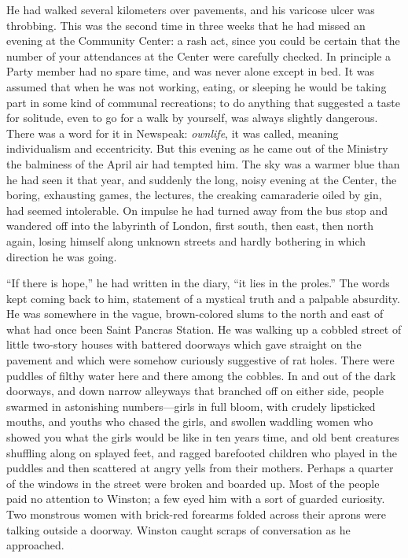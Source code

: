 He had walked several kilometers over pavements, and his varicose ulcer
was throbbing. This was the second time in three weeks that he had
missed an evening at the Community Center: a rash act, since you could
be certain that the number of your attendances at the Center were
carefully checked. In principle a Party member had no spare time, and
was never alone except in bed. It was assumed that when he was not
working, eating, or sleeping he would be taking part in some kind of
communal recreations; to do anything that suggested a taste for
solitude, even to go for a walk by yourself, was always slightly
dangerous. There was a word for it in Newspeak: \emph{ownlife}, it was
called, meaning individualism and eccentricity. But this evening as he
came out of the Ministry the balminess of the April air had tempted him.
The sky was a warmer blue than he had seen it that year, and suddenly
the long, noisy evening at the Center, the boring, exhausting games, the
lectures, the creaking camaraderie oiled by gin, had seemed intolerable.
On impulse he had turned away from the bus stop and wandered off into
the labyrinth of London, first south, then east, then north again,
losing himself along unknown streets and hardly bothering in which
direction he was going.

``If there is hope,'' he had written in the diary, ``it lies in the
proles.'' The words kept coming back to him, statement of a mystical
truth and a palpable absurdity. He was somewhere in the vague,
brown-colored slums to the north and east of what had once been Saint
Pancras Station. He was walking up a cobbled street of little two-story
houses with battered doorways which gave straight on the pavement and
which were somehow curiously suggestive of rat holes. There were puddles
of filthy water here and there among the cobbles. In and out of the dark
doorways, and down narrow alleyways that branched off on either side,
people swarmed in astonishing numbers---girls in full bloom, with
crudely lipsticked mouths, and youths who chased the girls, and swollen
waddling women who showed you what the girls would be like in ten years
time, and old bent creatures shuffling along on splayed feet, and ragged
barefooted children who played in the puddles and then scattered at
angry yells from their mothers. Perhaps a quarter of the windows in the
street were broken and boarded up. Most of the people paid no attention
to Winston; a few eyed him with a sort of guarded curiosity. Two
monstrous women with brick-red forearms folded across their aprons were
talking outside a doorway. Winston caught scraps of conversation as he
approached.

